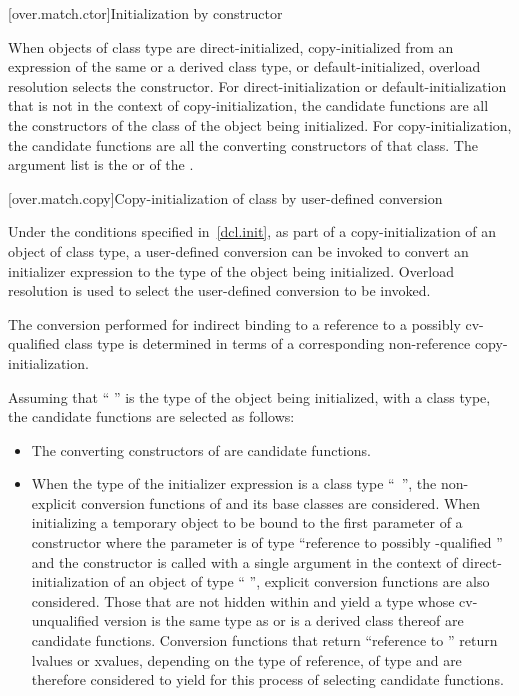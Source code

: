 [over.match.ctor]{Initialization by constructor}%

\pnum
When objects of class type are direct-initialized,
copy-initialized from an expression of the same or a
derived class type,
or default-initialized,
overload resolution selects the constructor.
For direct-initialization or default-initialization
that is not in the context of copy-initialization, the
candidate functions are
all the constructors of the class of the object being
initialized.
For copy-initialization, the candidate functions are all
the converting constructors of that
class.
The argument list is the
 or 
of the .

[over.match.copy]{Copy-initialization of class by user-defined conversion}%

\pnum
Under the conditions specified in~\ref{dcl.init}, as
part of a copy-initialization of an object of class type, a user-defined
conversion can be invoked to convert an initializer expression to the
type of the object being initialized.
Overload resolution is used
to select the user-defined conversion to be invoked.
\begin{note} The conversion performed for indirect binding to a reference to a possibly
cv-qualified class type is determined in terms of a corresponding non-reference
copy-initialization. \end{note}
Assuming that
`` '' is the type of the object being initialized, with
a class type,
the candidate functions are selected as follows:

\begin{itemize}
\item
The converting constructors of
are candidate functions.
\item
When the type of the initializer expression is a class type
``\cv{}~'',
the non-explicit conversion functions of
and its base classes are considered.
When initializing a temporary object
to be bound to the first parameter of a constructor
where the parameter is of type
``reference to possibly \cv-qualified ''
and the constructor is
called with a single argument in the context of
direct-initialization of an object of type `` '', explicit
conversion functions are also considered.
Those that are not hidden within
and yield a type whose cv-unqualified version is the same type as
or is a derived class thereof
are candidate functions.
Conversion functions that return ``reference to
''
return
lvalues or xvalues, depending on the type of reference, of type
and are therefore considered to yield
for this
process of selecting candidate functions.
\end{itemize}

